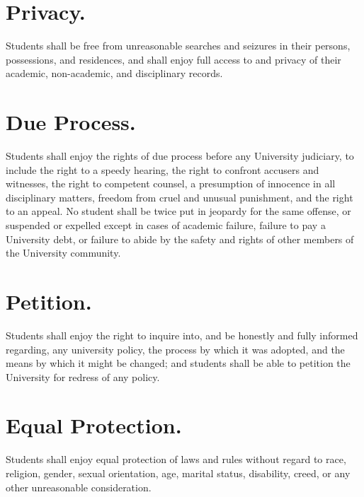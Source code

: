 \section{Privacy.}
    Students shall be free from unreasonable searches and seizures in their persons, possessions, and residences, and shall enjoy full access to and privacy of their academic, non-academic, and disciplinary records.


\section{Due Process.}
    Students shall enjoy the rights of due process before any University judiciary, to include the right to a speedy hearing, the right to confront accusers and witnesses, the right to competent counsel, a presumption of innocence in all disciplinary matters, freedom from cruel and unusual punishment, and the right to an appeal. No student shall be twice put in jeopardy for the same offense, or suspended or expelled except in cases of academic failure, failure to pay a University debt, or failure to abide by the safety and rights of other members of the University community.


\section{Petition.}
    Students shall enjoy the right to inquire into, and be honestly and fully informed regarding, any university policy, the process by which it was adopted, and the means by which it might be changed; and students shall be able to petition the University for redress of any policy.


\section{Equal Protection.}
    Students shall enjoy equal protection of laws and rules without regard to race, religion, gender, sexual orientation, age, marital status, disability, creed, or any other unreasonable consideration.